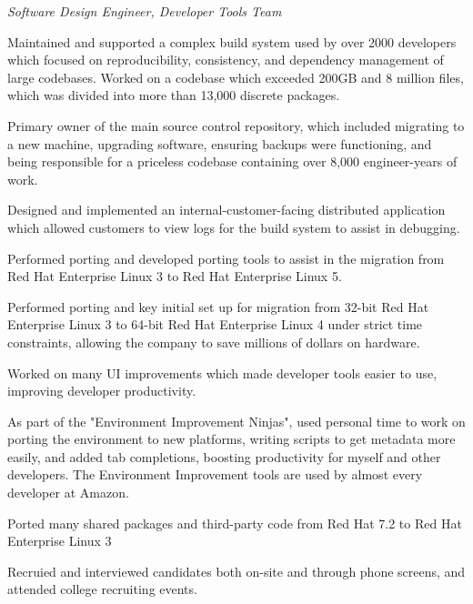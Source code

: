 \documentclass[margin,line]{resume}
\begin{document}
\begin{resume}
	\vspace{1mm} \vspace{1mm}%
	{\sl Software Design Engineer, Developer Tools Team} %
	\begin{list2}
		\vspace*{1mm}
	\item
		Maintained and supported a complex build system used by over 2000 developers
		which focused on reproducibility, consistency, and dependency management of
		large codebases.  Worked on a codebase which exceeded 200GB and 8 million
		files, which was divided into more than 13,000 discrete packages.
	\item
		Primary owner of the main source control repository, which included
		migrating to a new machine, upgrading software, ensuring backups were
		functioning, and being responsible for a priceless codebase containing
		over 8,000 engineer-years of work.
	\item
		Designed and implemented an internal-customer-facing distributed application
		which allowed customers to view logs for the build system to assist in
		debugging.
	\item
		Performed porting and developed porting tools to assist in the migration from
		Red Hat Enterprise Linux 3 to Red Hat Enterprise Linux 5.
	\item
		Performed porting and key initial set up for migration from 32-bit Red Hat
		Enterprise Linux 3 to 64-bit Red Hat Enterprise Linux 4 under strict time
		constraints, allowing the company to save millions of dollars on hardware.
	\item
		Worked on many UI improvements which made developer tools easier to use,
		improving developer productivity.
	\item
		As part of the "Environment Improvement Ninjas", used personal time to
		work on porting the environment to new platforms, writing scripts to
		get metadata more easily, and added tab completions, boosting
		productivity for myself and other developers.  The Environment
		Improvement tools are used by almost every developer at Amazon.
	\item
		Ported many shared packages and third-party code from Red Hat 7.2 to
		Red Hat Enterprise Linux 3
	\item
		Recruied and interviewed candidates both on-site and through phone
		screens, and attended college recruiting events.
	\end{list2}


\end{resume}
\end{document}
